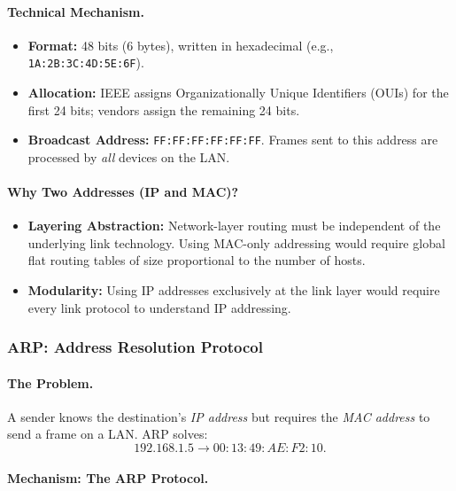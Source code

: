 \documentclass[12pt]{article}
\begin{document}
\paragraph{Technical Mechanism.}

\begin{itemize}
    \item \textbf{Format:} 48 bits (6 bytes), written in hexadecimal (e.g., \texttt{1A:2B:3C:4D:5E:6F}).
    \item \textbf{Allocation:} IEEE assigns Organizationally Unique Identifiers (OUIs) for the first 24 bits; vendors assign the remaining 24 bits.
    \item \textbf{Broadcast Address:} \texttt{FF:FF:FF:FF:FF:FF}. Frames sent to this address are processed by \emph{all} devices on the LAN.
\end{itemize}

\paragraph{Why Two Addresses (IP and MAC)?}

\begin{itemize}
    \item \textbf{Layering Abstraction:}
          Network-layer routing must be independent of the underlying link technology.
          Using MAC-only addressing would require global flat routing tables of size proportional to the number of hosts.
    \item \textbf{Modularity:}
          Using IP addresses exclusively at the link layer would require every link protocol to understand IP addressing.
\end{itemize}

\subsubsection{ARP: Address Resolution Protocol}

\paragraph{The Problem.}

A sender knows the destination's \emph{IP address} but requires the \emph{MAC address} to send a frame on a LAN.
ARP solves:
\[
    192.168.1.5 \longrightarrow 00:13:49:AE:F2:10.
\]

\paragraph{Mechanism: The ARP Protocol.}
\end{document}
